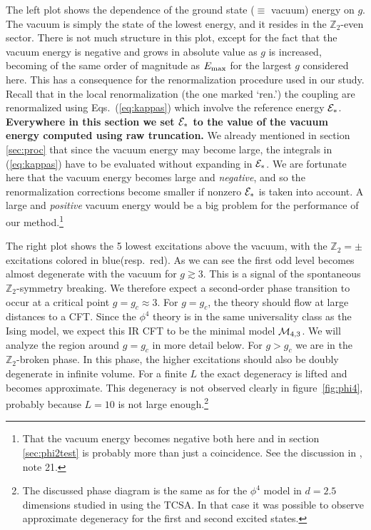 \documentclass[11pt]{article}
\newcommand{\reef}[1]{(\ref{#1})}
\def\bZ {\mathbb{Z}}
\def\calM {{\cal M}}
\def\calE {{\cal E}}
\def\bZ {\mathbb{Z}}
\def \Emax{E_{\rm max}}
\def \Er{{\calE_{\rm *}}}
\numberwithin{equation}{section}
\begin{document}
The left plot shows the dependence of the ground state ($\equiv$ vacuum) energy on $g$. The vacuum is simply the state of the lowest energy, and it resides in the $\bZ_2$-even sector. There is not much structure in this plot, except for the fact that the vacuum energy is negative and grows in absolute value as $g$ is increased, becoming of the same order of magnitude as $\Emax$ for the largest $g$ considered here. This has a consequence for the renormalization procedure used in our study. Recall that in the local renormalization (the one marked `ren.') the 
coupling are renormalized using Eqs.~\reef{eq:kappas} which involve the reference energy $\Er$. {\bf Everywhere 
in this section we set $\Er$ to the value of the vacuum energy computed using raw truncation.} We already mentioned in section \ref{sec:proc} that since the vacuum energy may become large, the integrals in \reef{eq:kappas} have to be evaluated without expanding in $\Er$. We are fortunate here that the vacuum energy becomes large and \emph{negative}, and so the renormalization corrections become smaller if nonzero $\Er$ is taken into account.
A large and \emph{positive} vacuum energy would be a big problem for the performance of our method.\footnote{That the vacuum energy becomes negative both here and in section \ref{sec:phi2test} is probably more than just a coincidence. See the discussion in \cite{Hogervorst:2014rta}, note 21.}

The right plot shows the 5 lowest excitations above the vacuum, with the $\bZ_2=\pm$ excitations colored in blue(resp.~red). As we can see the first odd level becomes almost degenerate with the vacuum for $g \gtrsim 3$. This is a signal of the spontaneous $\bZ_2$-symmetry breaking. We therefore expect a second-order phase transition to occur at a critical point $g = g_c \approx 3$. For $g=g_c$, the theory should flow at large distances to a CFT. Since the $\phi^4$ theory is in the same universality class as the Ising model, we expect this IR CFT to be the minimal model $\calM_{4,3}$. We will analyze the region around $g = g_c$ in more detail below. For $g > g_c$ we are in the $\bZ_2$-broken phase. In this phase, the higher excitations should also be doubly degenerate in infinite volume. For a finite $L$ the exact degeneracy is lifted and becomes approximate. This degeneracy is not observed clearly in figure~\ref{fig:phi4}, probably because $L=10$ is not large enough.\footnote{The discussed phase diagram is the same as for the $\phi^4$ model in $d=2.5$ dimensions studied in \cite{Hogervorst:2014rta} using the TCSA. In that case it was possible to observe approximate degeneracy for the first and second excited states.}
\end{document}
